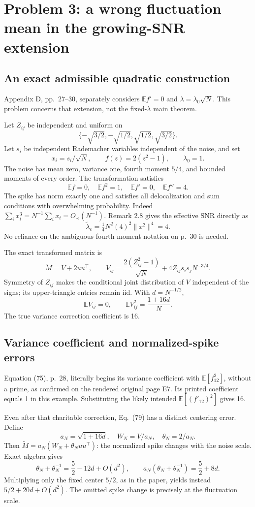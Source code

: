\documentclass[10pt]{article}
\begin{document}
\section*{Problem 3: a wrong fluctuation mean in the growing-SNR extension}
\subsection*{An exact admissible quadratic construction}
Appendix D, pp. 27–30, separately considers \(\mathbb E f'=0\) and \(\lambda=\lambda_0\sqrt N\). This problem concerns that extension, not the fixed-\(\lambda\) main theorem.\par
Let \(Z_{ij}\) be independent and uniform on \[\{-\sqrt{3/2},-\sqrt{1/2},\sqrt{1/2},\sqrt{3/2}\}.\] Let \(s_i\) be independent Rademacher variables independent of the noise, and set \[x_i=s_i/\sqrt N,\qquad f(z)=2(z^2-1),\qquad \lambda_0=1.\] The noise has mean zero, variance one, fourth moment \(5/4\), and bounded moments of every order. The transformation satisfies \[\mathbb E f=0,\quad \mathbb E f^2=1,\quad
 \mathbb E f'=0,\quad \mathbb E f''=4.\] The spike has norm exactly one and satisfies all delocalization and sum conditions with overwhelming probability. Indeed \(\sum_i x_i^3=N^{-1}\sum_i x_i=O_\prec(N^{-1})\). Remark 2.8 gives the effective SNR directly as \[\widetilde\lambda_e=\tfrac14N^2(4)^2\|x^2\|^4=4.\] No reliance on the ambiguous fourth-moment notation on p. 30 is needed.\par
The exact transformed matrix is \[\widetilde M=V+2uu^\top,\qquad
 V_{ij}=\frac{2(Z_{ij}^2-1)}{\sqrt N}
       +4Z_{ij}s_is_jN^{-3/4}.\] Symmetry of \(Z_{ij}\) makes the conditional joint distribution of \(V\) independent of the signs; its upper-triangle entries remain iid. With \(d=N^{-1/2}\), \[\mathbb E V_{ij}=0,\qquad
 \mathbb E V_{ij}^2=\frac{1+16d}{N}.\] The true variance correction coefficient is 16.\par
\subsection*{Variance coefficient and normalized-spike errors}
Equation (75), p. 28, literally begins its variance coefficient with \(\mathbb E[f_{12}^2]\), without a prime, as confirmed on the rendered original page E7. Its printed coefficient equals 1 in this example. Substituting the likely intended \(\mathbb E[(f'_{12})^2]\) gives 16.\par
Even after that charitable correction, Eq. (79) has a distinct centering error. Define \[a_N=\sqrt{1+16d},\quad W_N=V/a_N,\quad \theta_N=2/a_N.\] Then \(\widetilde M=a_N(W_N+\theta_Nuu^\top)\): the normalized spike changes with the noise scale. Exact algebra gives \[\theta_N+\theta_N^{-1}=\frac52-12d+O(d^2),\qquad
 a_N(\theta_N+\theta_N^{-1})=\frac52+8d.\] Multiplying only the fixed center \(5/2\), as in the paper, yields instead \(5/2+20d+O(d^2)\). The omitted spike change is precisely at the fluctuation scale.\par
\end{document}
